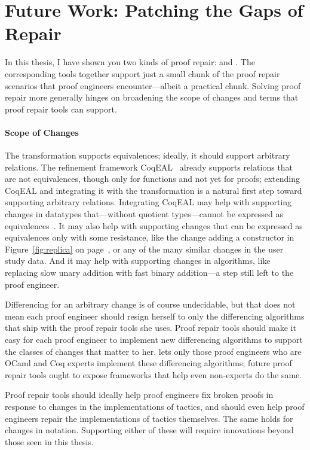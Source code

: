 \section{Future Work: Patching the Gaps of Repair}
\label{sec:more}

In this thesis, I have shown you two kinds of proof repair:  and .
The corresponding tools together support just a small chunk of the proof repair scenarios that proof engineers encounter---albeit a practical chunk.
Solving proof repair more generally hinges on broadening the scope of changes and terms that proof repair tools can support.

\paragraph{Scope of Changes}
The \toolnamec transformation supports equivalences; ideally, it should support arbitrary relations.
The refinement framework CoqEAL~\cite{cohen:hal-01113453} already supports relations that are not equivalences, though only for functions and not yet for proofs;
extending CoqEAL and integrating it with the \toolnamec transformation is a natural first step toward supporting arbitrary relations.
Integrating CoqEAL may help with supporting changes in datatypes that---without quotient types---cannot be expressed as equivalences~\cite{angiuli2020internalizing}.
It may also help with supporting changes that can be expressed as equivalences only with some resistance,
like the change adding a constructor in Figure~\ref{fig:replica} on page~\pageref{fig:replica},
or any of the many similar changes in the  user study data.
And it may help with supporting changes in algorithms, like replacing slow unary addition with fast binary addition---a step still
left to the proof engineer.

Differencing for an arbitrary change is of course undecidable, but that does not mean each proof engineer should resign herself to only the differencing 
algorithms that ship with the proof repair tools she uses.
Proof repair tools should make it easy for each proof engineer to implement new differencing algorithms to support the classes of changes that matter to her.
\sysnamelong lets only those proof engineers who are OCaml and Coq experts implement these differencing algorithms;
future proof repair tools ought to expose frameworks that help even non-experts do the same.

Proof repair tools should ideally help proof engineers fix broken proofs in response to changes in the implementations of tactics,
and should even help proof engineers repair the implementations of tactics themselves.
The same holds for changes in notation.
Supporting either of these will require innovations beyond those seen in this thesis.

